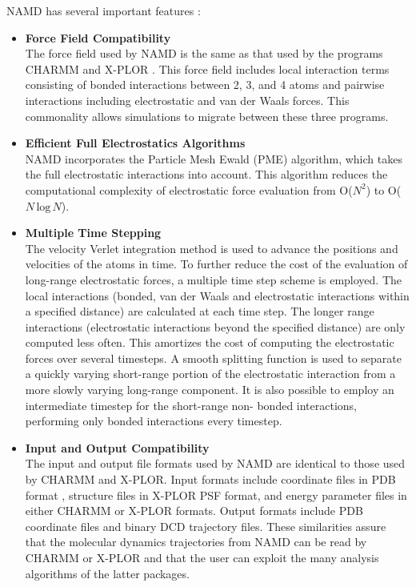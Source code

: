 NAMD has several important features \cite{ref:NAMD_ug}:
\begin{itemize}
\item \textbf{Force Field Compatibility}\\
The force field used by NAMD is the same as that used by the programs CHARMM \cite{brooks1983charmm} and X-PLOR \cite{brunger1988howard}. This force field includes local interaction terms consisting of bonded interactions between 2, 3, and 4 atoms and pairwise interactions including electrostatic and van der Waals forces. This commonality allows simulations to migrate between these three programs.
\item \textbf{Efficient Full Electrostatics Algorithms}\\
NAMD incorporates the Particle Mesh Ewald (PME) algorithm, which takes the full electrostatic interactions into account. This algorithm reduces the computational complexity of electrostatic force evaluation from O($N^2$) to O($N \, \text{log} \, N$).
\item \textbf{Multiple Time Stepping}\\
The velocity Verlet integration method is used to advance the positions and velocities of the atoms in time. To further reduce the cost of the evaluation of long-range electrostatic forces, a multiple time step scheme is employed. The local interactions (bonded, van der Waals and electrostatic interactions within a specified distance) are calculated at each time step. The longer range interactions (electrostatic interactions beyond the specified distance) are only computed less often. This amortizes the cost of computing the electrostatic forces over several timesteps. A smooth splitting function is used to separate a quickly varying short-range portion of the electrostatic interaction from a more slowly varying long-range component. It is also possible to employ an intermediate timestep for the short-range non- bonded interactions, performing only bonded interactions every timestep.
\item \textbf{Input and Output Compatibility}\\
The input and output file formats used by NAMD are identical to those used by CHARMM and X-PLOR. Input formats include coordinate files in PDB format \cite{bernstein1977protein}, structure files in X-PLOR PSF format, and energy parameter files in either CHARMM or X-PLOR formats. Output formats include PDB coordinate files and binary DCD trajectory files. These similarities assure that the molecular dynamics trajectories from NAMD can be read by CHARMM or X-PLOR and that the user can exploit the many analysis algorithms of the latter packages.

\end{itemize}
